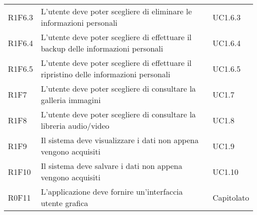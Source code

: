 \begin{longtable}{lp{}l}
R1F6.3
& L'utente deve poter scegliere di eliminare le informazioni personali
& UC1.6.3 \\
R1F6.4
& L'utente deve poter scegliere di effettuare il backup delle informazioni personali
& UC1.6.4 \\
R1F6.5
& L'utente deve poter scegliere di effettuare il ripristino delle informazioni personali
& UC1.6.5 \\
R1F7
& L'utente deve poter scegliere di consultare la galleria immagini
& UC1.7 \\
R1F8
& L'utente deve poter scegliere di consultare la libreria audio/video
& UC1.8 \\
R1F9
& Il sistema deve visualizzare i dati non appena vengono acquisiti
& UC1.9 \\
R1F10
& Il sistema deve salvare i dati non appena vengono acquisiti
& UC1.10 \\
R0F11
& L'applicazione deve fornire un'interfaccia utente grafica
& Capitolato \\
\end{longtable}
